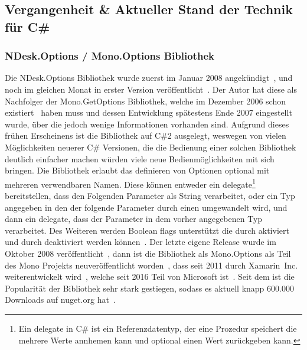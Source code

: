   \subsection{Vergangenheit \& Aktueller Stand der Technik für C\#}\label{subsec:CurrentState}
  \subsubsection{NDesk.Options / Mono.Options Bibliothek}
  Die NDesk.Options Bibliothek wurde zuerst im Januar 2008 angekündigt~\cite{NDeskAnnouncement},
  und noch im gleichen Monat in erster Version veröffentlicht~\cite{NDesk1stRelease}.
  Der Autor hat diese als Nachfolger der Mono.GetOptions Bibliothek,
  welche im Dezember 2006 schon existiert~\cite{MonoGetOptions3rdBlogPost} haben muss und dessen Entwicklung spätestens Ende 2007 eingestellt wurde,
  über die jedoch wenige Informationen vorhanden sind.
  Aufgrund dieses frühen Erscheinens ist die Bibliothek auf C\#2 ausgelegt, weswegen von vielen Möglichkeiten neuerer C\# Versionen,
  die die Bedienung einer solchen Bibliothek deutlich einfacher machen würden viele neue Bedienmöglichkeiten mit sich bringen.
  Die Bibliothek erlaubt das definieren von Optionen optional mit mehreren verwendbaren Namen.
  Diese können entweder ein delegate\footnote{Ein delegate in C\# ist ein Referenzdatentyp, der eine Prozedur speichert die mehrere Werte annhemen kann und optional einen Wert zurückgeben kann.} bereitstellen, dass den Folgenden Parameter als String verarbeitet,
  oder ein Typ angegeben in den der folgende Parameter durch einen  umgewandelt wird,
  und dann ein delegate, dass der Parameter in dem vorher angegebenen Typ verarbeitet.
  Des Weiteren werden Boolean flags unterstützt die durch  aktiviert
  und durch  deaktiviert werden können~\cite{NDeskOptionSetDocumentation}.
  Der letzte eigene Release wurde im Oktober 2008 veröffentlicht~\cite{NDeskOptionsLastRelease},
  dann ist die Bibliothek als Mono.Options als Teil des Mono Projekts neuveröffentlicht worden~\cite{MonoOptions1stCommit},
  dass seit 2011 durch Xamarin~Inc. weiterentwickelt wird~\cite{MonoFutureInterview}, welche seit 2016 Teil von Microsoft ist~\cite{MicrosoftBlogAcquireXamarin}.
  Seit dem ist die Popularität der Bibliothek sehr stark gestiegen, sodass es aktuell knapp 600.000 Downloads auf nuget.org hat~\cite{MonoOptionsNuget}.
